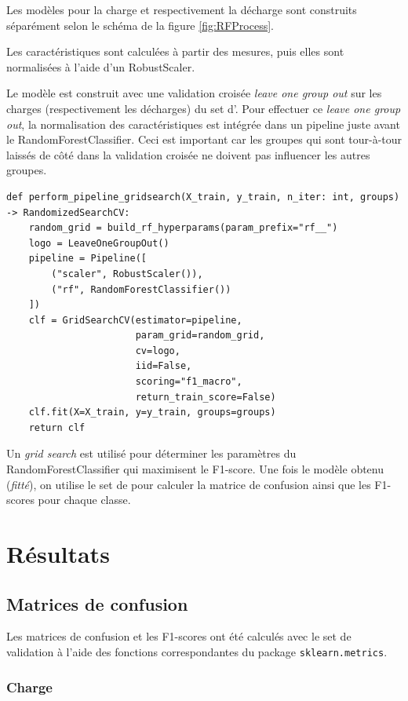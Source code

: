Les modèles pour la charge et respectivement la décharge sont construits séparément selon le schéma de la figure \ref{fig:RFProcess}.

Les caractéristiques sont calculées à partir des mesures, puis elles sont normalisées à l'aide d'un RobustScaler.

Le modèle est construit avec une validation croisée \textit{leave one group out} sur les charges (respectivement les décharges) du set d'. Pour effectuer ce \textit{leave one group out}, la normalisation des caractéristiques est intégrée dans un pipeline juste avant le RandomForestClassifier. Ceci est important car les groupes qui sont tour-à-tour laissés de côté dans la validation croisée ne doivent pas influencer les autres groupes.

\begin{verbatim}
def perform_pipeline_gridsearch(X_train, y_train, n_iter: int, groups) -> RandomizedSearchCV:
    random_grid = build_rf_hyperparams(param_prefix="rf__")
    logo = LeaveOneGroupOut()
    pipeline = Pipeline([
        ("scaler", RobustScaler()),
        ("rf", RandomForestClassifier())
    ])
    clf = GridSearchCV(estimator=pipeline,
                       param_grid=random_grid,
                       cv=logo,
                       iid=False,
                       scoring="f1_macro",
                       return_train_score=False)
    clf.fit(X=X_train, y=y_train, groups=groups)
    return clf
\end{verbatim}

Un \textit{grid search} est utilisé pour déterminer les paramètres du RandomForestClassifier qui maximisent le F1-score. Une fois le modèle obtenu (\textit{fitté}), on utilise le set de  pour calculer la matrice de confusion ainsi que les F1-scores pour chaque classe.

\clearpage
\section{Résultats}
\subsection{Matrices de confusion}

Les matrices de confusion et les F1-scores ont été calculés avec le set de validation à l'aide des fonctions correspondantes du package \texttt{sklearn.metrics}.

\subsubsection{Charge}


